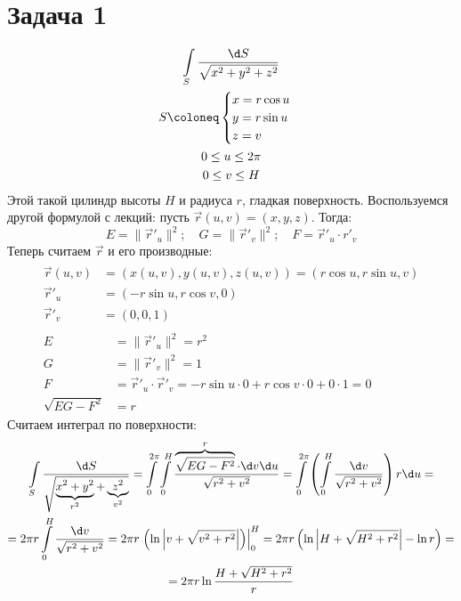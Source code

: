 \section{Задача 1}
\begin{gather*}
	\int\limits_S \frac{\d S}{\sqrt{x^2+y^2+z^2}} \\
	S \coloneq
		\begin{cases}
			x = r \cos u \\
			y = r \sin u \\
			z = v
		\end{cases} \\
	0 \le u \le 2 \pi \\
	0 \le v \le H
\end{gather*}
Этой такой цилиндр высоты $H$ и радиуса $r$, гладкая поверхность.
Воспользуемся другой формулой с лекций: пусть $\vec r(u, v) = (x, y, z)$. Тогда:
\begin{equation}\label{int_surf_I_dot}
	E = \|\vec r'_u\|^2;
	\quad
	G = \|\vec r'_v\|^2;
	\quad
	F = \vec r'_u \cdot r'_v
\end{equation}
Теперь считаем $\vec r$ и его производные:
\begin{gather*}
	\begin{aligned}
		\vec r(u, v) &= (x(u, v), y(u, v), z(u, v)) = (r \cos u, r \sin u, v) \\
		\vec r'_u &= (-r \sin u, r \cos v, 0) \\
		\vec r'_v &= (0, 0, 1)
	\end{aligned} \\
	\begin{aligned}
		E &= \|\vec r'_u\|^2 =  r^2 \\
		G &= \|\vec r'_v\|^2 = 1 \\
		F &= \vec r'_u \cdot \vec r'_v = -r\sin u \cdot 0 + r\cos v \cdot 0 + 0 \cdot 1 = 0 \\
		\sqrt{EG-F^2} &= r
	\end{aligned}
\end{gather*}
Считаем интеграл по поверхности:
\begin{gather*}
	\int\limits_S \frac{\d S}{\sqrt{\underbrace{x^2+y^2}_{r^2}+\underbrace{z^2}_{v^2}}} =
	\int\limits_0^{2\pi} \int\limits_0^H \frac{\overbrace{\sqrt{EG-F^2}}^{r} \cdot \d v \d u}{\sqrt{r^2+v^2}} =
	\int\limits_0^{2\pi} \left(\int\limits_0^H \frac{\d v}{\sqrt{r^2+v^2}}\right)r \d u = \\
	= 2 \pi r \int\limits_0^H \frac{\d v}{\sqrt{r^2+v^2}} =
	2 \pi r \left.\left( \ln \left| v + \sqrt{v^2 + r^2} \right| \right)\right|_0^H =
	2 \pi r \left( \ln \left| H + \sqrt{H^2 + r^2} \right| - \ln r \right) = \\
	= 2 \pi r \ln \frac{H + \sqrt{H^2 + r^2}}{r}
\end{gather*}

